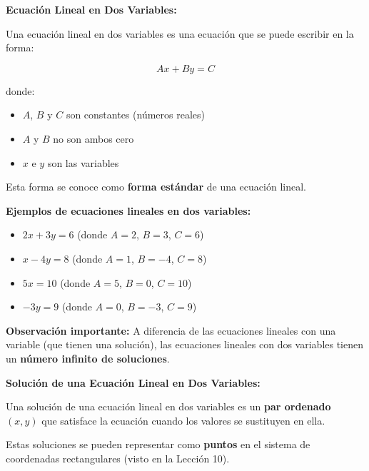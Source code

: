 


\begin{definition}
\textbf{Ecuación Lineal en Dos Variables:}

Una ecuación lineal en dos variables es una ecuación que se puede escribir en la forma:

$$\boxed{Ax + By = C}$$

donde:
\begin{itemize}
    \item $A$, $B$ y $C$ son constantes (números reales)
    \item $A$ y $B$ no son ambos cero
    \item $x$ e $y$ son las variables
\end{itemize}

Esta forma se conoce como \textbf{forma estándar} de una ecuación lineal.
\end{definition}

\textbf{Ejemplos de ecuaciones lineales en dos variables:}
\begin{itemize}
    \item $2x + 3y = 6$ \quad (donde $A = 2$, $B = 3$, $C = 6$)
    \item $x - 4y = 8$ \quad (donde $A = 1$, $B = -4$, $C = 8$)
    \item $5x = 10$ \quad (donde $A = 5$, $B = 0$, $C = 10$)
    \item $-3y = 9$ \quad (donde $A = 0$, $B = -3$, $C = 9$)
\end{itemize}

\textbf{Observación importante:} A diferencia de las ecuaciones lineales con una variable (que tienen una solución), las ecuaciones lineales con dos variables tienen un \textbf{número infinito de soluciones}.

\newpage

\begin{definition}
\textbf{Solución de una Ecuación Lineal en Dos Variables:}

Una solución de una ecuación lineal en dos variables es un \textbf{par ordenado} $(x, y)$ que satisface la ecuación cuando los valores se sustituyen en ella.

Estas soluciones se pueden representar como \textbf{puntos} en el sistema de coordenadas rectangulares (visto en la Lección 10).
\end{definition}

